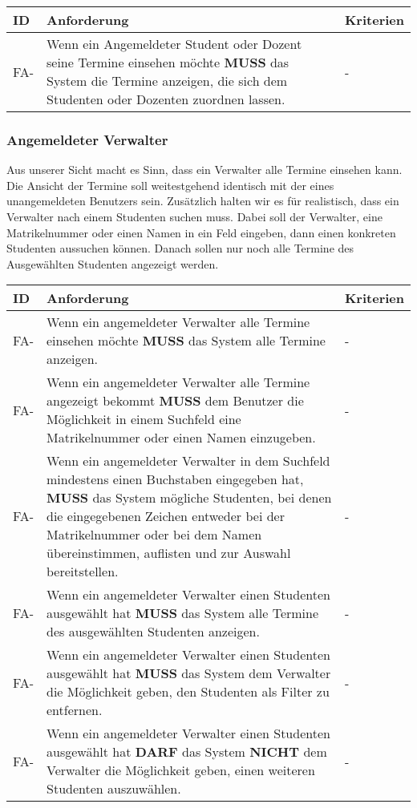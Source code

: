 \vspace{12pt}

\begin{tabular} {|p{}|p{11cm}|p{}|}
	\hline
	ID & Anforderung & Kriterien \\
	\hline
	FA-
	& Wenn ein Angemeldeter Student oder Dozent seine Termine einsehen möchte \textbf{MUSS} das System die Termine anzeigen, die sich dem Studenten oder Dozenten zuordnen lassen. 
	& - \\
	\hline
\end{tabular}

\newpage

\subsubsection{Angemeldeter Verwalter}
Aus unserer Sicht macht es Sinn, dass ein Verwalter alle Termine einsehen kann. Die Ansicht der Termine soll weitestgehend identisch mit der eines unangemeldeten Benutzers sein. Zusätzlich halten wir es für realistisch, dass ein Verwalter nach einem Studenten suchen muss. Dabei soll der Verwalter, eine Matrikelnummer oder einen Namen in ein Feld eingeben, dann einen konkreten Studenten aussuchen können. Danach sollen nur noch alle Termine des Ausgewählten Studenten angezeigt werden.

\vspace{12pt}

\begin{tabular} {|p{}|p{11cm}|p{}|}
	\hline
	ID & Anforderung & Kriterien \\
	\hline
	FA-
	& Wenn ein angemeldeter Verwalter alle Termine einsehen möchte \textbf{MUSS} das System alle Termine anzeigen. 
	& - \\
	\hline
	FA-
	& Wenn ein angemeldeter Verwalter alle Termine angezeigt bekommt \textbf{MUSS} dem Benutzer die Möglichkeit in einem Suchfeld eine Matrikelnummer oder einen Namen einzugeben. 
	& - \\
	\hline
	FA-
	& Wenn ein angemeldeter Verwalter in dem Suchfeld mindestens einen Buchstaben eingegeben hat, \textbf{MUSS} das System mögliche Studenten, bei denen die eingegebenen Zeichen entweder bei der Matrikelnummer oder bei dem Namen übereinstimmen, auflisten und zur Auswahl bereitstellen. 
	& - \\
	\hline
	FA-
	& Wenn ein angemeldeter Verwalter einen Studenten ausgewählt hat \textbf{MUSS} das System alle Termine des ausgewählten Studenten anzeigen. 
	& - \\
	\hline
	FA-
	& Wenn ein angemeldeter Verwalter einen Studenten ausgewählt hat \textbf{MUSS} das System dem Verwalter die Möglichkeit geben, den Studenten als Filter zu entfernen. 
	& - \\
	\hline
	FA-
	& Wenn ein angemeldeter Verwalter einen Studenten ausgewählt hat \textbf{DARF} das System \textbf{NICHT} dem Verwalter die Möglichkeit geben, einen weiteren Studenten auszuwählen. 
	& - \\
	\hline
\end{tabular}

